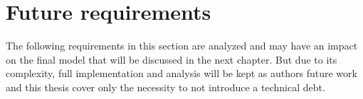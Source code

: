 





\section{Future requirements}

The following requirements in this section are analyzed and may have an impact on the final model that will be discussed in the next chapter. But due to its complexity, full implementation and analysis will be kept as authors future work and this thesis cover only the necessity to not introduce a technical debt.







